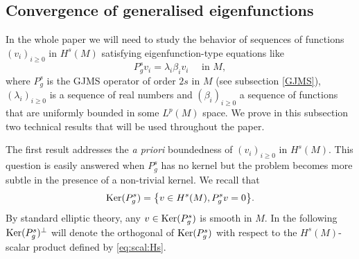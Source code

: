 \documentclass[10pt]{amsart}
\numberwithin{equation}{section}
\def\ker{{\mathop{\rm Ker}}}
\theoremstyle{plain}
\theoremstyle{remark}
\begin{document}
\subsection{Convergence of generalised eigenfunctions}
In the whole paper we will need to study the behavior of sequences of functions $(v_i)_{i\ge0}$ in $H^s(M)$ satisfying eigenfunction-type equations like
\begin{equation*}
 P_g^s v_i = \lambda_i \beta_i v_i  \quad \text{ in } M, 
 \end{equation*}
where $P_g^s$ is the GJMS operator of order $2s$ in $M$ (see subsection \ref{GJMS}), $(\lambda_i)_{i \ge0}$ is a sequence of real numbers and $(\beta_i)_{i \ge0}$ a sequence of functions that are uniformly bounded in some $L^p(M)$ space. We prove in this subsection two technical results that will be used throughout the paper. 

\medskip

The first result addresses the \emph{a priori} boundedness of $(v_i)_{i \ge 0}$ in $H^s(M)$. This question is easily answered when $P_g^s$ has no kernel but the problem becomes more subtle in the presence of a non-trivial kernel. We recall that 
$$ \ker (P_g^s) = \big \{ v \in H^s(M), P_g^s v = 0 \big \}. $$
By standard elliptic theory, any $v \in \ker (P_g^s)$ is smooth in $M$. In the following $\ker(P_g^s)^{\perp}$ will denote the orthogonal of $\ker(P_g^s)$ with respect to the $H^s(M)$-scalar product defined by \eqref{eq:scal:Hs}. 
\end{document}
